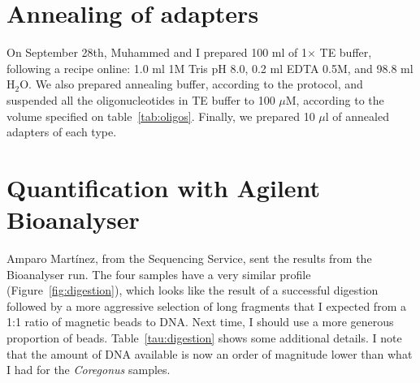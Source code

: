 \documentclass[a4paper,12pt]{article}
\begin{document}
\section{Annealing of adapters}
On September 28th, Muhammed and I prepared 100 ml of 1$\times$ TE buffer, following a recipe online: 1.0 ml 1M Tris pH 8.0, 0.2 ml EDTA 0.5M, and 98.8 ml H$_2$O. We also prepared annealing buffer, according to the protocol, and suspended all the oligonucleotides in TE buffer to 100 $\mu$M, according to the volume specified on table~\ref{tab:oligos}. Finally, we prepared 10 $\mu$l of annealed adapters of each type.

\section{Quantification with Agilent Bioanalyser}
Amparo Martínez, from the Sequencing Service, sent the results from the Bioanalyser run. The four samples have a very similar profile (Figure~\ref{fig:digestion}), which looks like the result of a successful digestion followed by a more aggressive selection of long fragments that I expected from a 1:1 ratio of magnetic beads to DNA. Next time, I should use a more generous proportion of beads. Table~\ref{tau:digestion} shows some additional details. I note that the amount of DNA available is now an order of magnitude lower than what I had for the \emph{Coregonus} samples.
\end{document}
